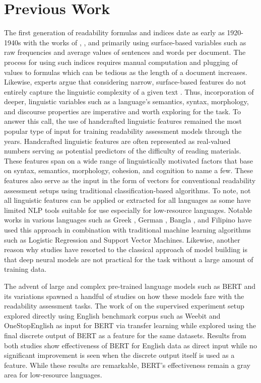 \documentclass[11pt,a4paper]{article}
\begin{document}
\section{Previous Work}
The first generation of readability formulas and indices date as early as 1920-1940s with the works of \citet{thorndike1921teacher}, \citet{dale1948formula}, and \citet{flesch1948new} primarily using surface-based variables such as raw frequencies and average values of sentences and words per document. The process for using such indices requires manual computation and plugging of values to formulas which can be tedious as the length of a document increases. Likewise, experts argue that considering narrow, surface-based features do not entirely capture the linguistic complexity of a given text \cite{Macahilig2015,collins-thompson-callan-2004-language,SiCallan}. Thus, incorporation of deeper, linguistic variables such as a language's semantics, syntax, morphology, and discourse properties are imperative and worth exploring for the task. To answer this call, the use of handcrafted linguistic features remained the most popular type of input for training readability assessment models through the years. Handcrafted linguistic features are often represented as real-valued numbers serving as potential predictors of the difficulty of reading materials. These features span on a wide range of linguistically motivated factors that base on syntax, semantics, morphology, cohesion, and cognition to name a few. These features also serve as the input in the form of vectors for conventional readability assessment setups using traditional classification-based algorithms. To note, not all linguistic features can be applied or extracted for all languages as some have limited NLP tools suitable for use especially for low-resource languages. Notable works in various languages such as Greek \cite{chatzipanagiotidis-etal-2021-broad}, German \cite{weiss-meurers-2019-analyzing,weiss-meurers-2018-modeling,hancke-etal-2012-readability}, Bangla \cite{sinha-etal-2012-new-readability}, and Filipino \cite{imperial2021application,imperial2020exploring} have used this approach in combination with traditional machine learning algorithms such as Logistic Regression and Support Vector Machines. Likewise, another reason why studies have resorted to the classical approach of model building is that deep neural models are not practical for the task without a large amount of training data.

The advent of large and complex pre-trained language models such as BERT and its variations spawned a handful of studies on how these models fare with the readability assessment tasks. The work of \citet{martinc2021supervised} on the supervised experiment setup explored directly using English benchmark corpus such as Weebit and OneStopEnglish as input for BERT via transfer learning while \citet{deutsch-etal-2020-linguistic} explored using the final discrete output of BERT as a feature for the same datasets. Results from both studies show effectiveness of BERT for English data as direct input while no significant improvement is seen when the discrete output itself is used as a feature. While these results are remarkable, BERT's effectiveness remain a gray area for low-resource languages.
\end{document}
